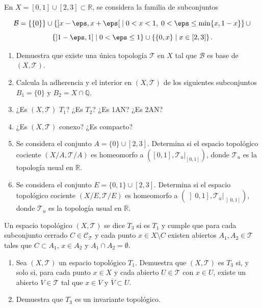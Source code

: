\documentclass[12pt]{article}
\begin{document}
    \begin{ejercicio}
        En $X = \left[0, 1\right] \cup \left[2, 3\right] \subset \mathbb{R}$, se considera la familia de subconjuntos
        
        $$\mathcal{B} = \{\{0\}\} \cup \left\{ \left]x - \eps, x + \eps\right[ \;\middle|\; 0 < x < 1,\; 0 < \eps \leq \min\{x, 1 - x\} \right\} \cup $$ 
        $$\left\{ \left]1 - \eps, 1\right] \;\middle|\; 0 < \eps \leq 1 \right\} \cup \left\{ \{0, x\} \;\middle|\; x \in \left[2, 3\right] \right\}.$$
        
        \begin{enumerate}[label=\alph*)]
            \item Demuestra que existe una única topología $\mathcal{T}$ en $X$ tal que $\mathcal{B}$ es base de $(X, \mathcal{T})$.
            \item Calcula la adherencia y el interior en $(X, \mathcal{T})$ de los siguientes subconjuntos $B_1 = \{0\}$ y $B_2 = X \cap \mathbb{Q}$.
            \item ¿Es $(X, \mathcal{T})$ $T_1$? ¿Es $T_2$? ¿Es $1\text{AN}$? ¿Es $2\text{AN}$?
            \item ¿Es $(X, \mathcal{T})$ conexo? ¿Es compacto?
            \item Se considera el conjunto $A = \{0\} \cup \left[2, 3\right]$. Determina si el espacio topológico cociente $(X/A, \mathcal{T}/A)$ es homeomorfo a $\left(\left[0, 1\right], \mathcal{T}_u|_{\left[0, 1\right]}\right)$, donde $\mathcal{T}_u$ es la topología usual en $\mathbb{R}$.
            \item Se considera el conjunto $E = \{0, 1\} \cup \left[2, 3\right]$. Determina si el espacio topológico cociente $(X/E, \mathcal{T}/E)$ es homeomorfo a $\left(\left]0, 1\right], \mathcal{T}_u|_{\left]0, 1\right]}\right)$, donde $\mathcal{T}_u$ es la topología usual en $\mathbb{R}$.
        \end{enumerate}
    \end{ejercicio}

    \begin{ejercicio}
        Un espacio topológico $(X, \mathcal{T})$ se dice $T_3$ si es $T_1$ y cumple que para cada subconjunto cerrado $C \in \mathcal{C}_{\mathcal{T}}$ y cada punto $x \in X \setminus C$ existen abiertos $A_1, A_2 \in \mathcal{T}$ tales que $C \subset A_1$, $x \in A_2$ y $A_1 \cap A_2 = \emptyset$.
        \begin{enumerate}[label=\alph*)]
            \item Sea $(X, \mathcal{T})$ un espacio topológico $T_1$. Demuestra que $(X, \mathcal{T})$ es $T_3$ si, y solo si, para cada punto $x \in X$ y cada abierto $U \in \mathcal{T}$ con $x \in U$, existe un abierto $V \in \mathcal{T}$ tal que $x \in V$ y $\overline{V} \subset U$.
            \item Demuestra que $T_3$ es un invariante topológico.
        \end{enumerate}
    \end{ejercicio}
\end{document}
